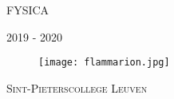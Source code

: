 
\null\thispagestyle{empty}

\vfill

\begin{center}
\textsc{\LARGE FYSICA}
\end{center}
\begin{center}
\textsc{2019 - 2020}
\end{center}

\vfill

\begin{figure}[h]
\centering
\texttt{[image: flammarion.jpg]}
\end{figure}

\begin{center}
\textsc{Sint-Pieterscollege Leuven}
\end{center}

\vfill

